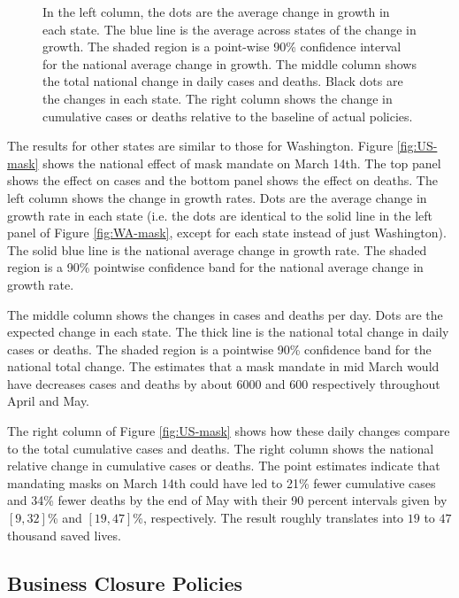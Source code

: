 \documentclass[11pt,reqno,letter]{amsart}
\theoremstyle{definition}
\begin{document}
\begin{figure}[ht]
\begin{minipage}{\linewidth}
    \begin{flushleft}
      \footnotesize In the left column, the dots are the average
      change in growth in each state. The blue line is the average
      across states of the change in growth. The shaded region is a
      point-wise 90\% confidence interval for the national average
      change in growth.  The middle column shows the total national
      change in daily cases and deaths. Black dots are the changes in each
      state.  The right column shows the change in cumulative cases or
      deaths relative to the baseline of actual policies.
    \end{flushleft}
  \end{minipage}
\end{figure}


The results for other states are similar to those for Washington.
Figure \ref{fig:US-mask} shows the national effect of mask mandate on
March 14th. The top panel shows the effect on cases and the bottom
panel shows the effect on deaths. The left column shows the change in
growth rates. Dots are the average change in growth rate in each state
(i.e. the dots are identical to the solid line in the left panel of
Figure \ref{fig:WA-mask}, except for each state instead of just
Washington). The solid blue line is the national average change in growth
rate. The shaded region is a 90\% pointwise confidence band for the
national average change in growth rate.

The middle column shows the changes in cases and deaths per day. Dots
are the expected change in each state. The thick line is the national
total change in daily cases or deaths. The shaded region is a
pointwise 90\% confidence band for the national total change. The
estimates that a mask mandate in mid March would have decreases cases
and deaths by about 6000 and 600 respectively throughout April and
May.

The right column of Figure \ref{fig:US-mask} shows how these daily
changes compare to the total cumulative cases and deaths. The right
column shows the national relative change in cumulative cases
or deaths. The point estimates indicate that mandating masks on March
14th could have led to 21\% fewer cumulative cases and 34\% fewer
deaths by the end of May with their 90 percent intervals
given by $[9,32]$\% and $[19,47]$\%, respectively.
The result roughly translates into $19$ to $47$ thousand saved lives.

\subsection{Business Closure Policies}
\end{document}
